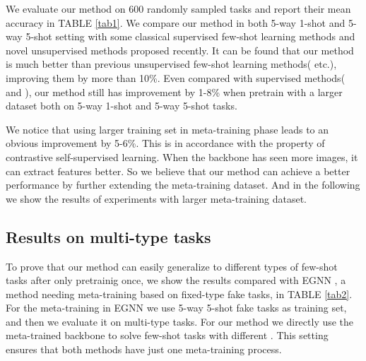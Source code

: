 \documentclass[conference]{IEEEtran}
\begin{document}
We evaluate our method on 600 randomly sampled tasks and report their mean accuracy in TABLE \ref{tab1}. We compare our method in both 5-way 1-shot and 5-way 5-shot setting with some classical supervised few-shot learning methods and novel unsupervised methods proposed recently. It can be found that our method is much better than previous unsupervised few-shot learning methods( \cite{ji2019unsupervised} etc.), improving them by more than 10\%. Even compared with supervised methods(\cite{finn2017model} and \cite{snell2017prototypical}), our method still has improvement by 1-8\% when pretrain with a larger dataset both on 5-way 1-shot and 5-way 5-shot tasks.


We notice that using larger training set in meta-training phase leads to an obvious improvement by 5-6\%. This is in accordance with the property of contrastive self-supervised learning. When the backbone has seen more images, it can extract features better. So we believe that our method can achieve a better performance by further extending the meta-training dataset. And in the following we show the results of experiments with larger meta-training dataset.
\subsection{Results on multi-type tasks}
To prove that our method can easily generalize to different types of few-shot tasks after only pretrainig once, we show the results compared with EGNN \cite{kim2019edge}, a method needing meta-training based on fixed-type fake tasks, in TABLE \ref{tab2}. For the meta-training in EGNN we use 5-way 5-shot fake tasks as training set, and then we evaluate it on multi-type tasks. For our method we directly use the meta-trained backbone to solve few-shot tasks with different . This setting ensures that both methods have just one meta-training process.
\end{document}
